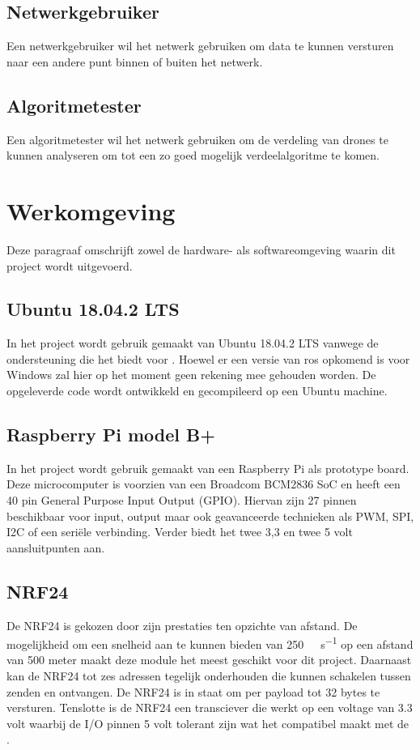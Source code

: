 \documentclass[a4paper, 11pt, oneside]{report}
\begin{document}
\subsection{Netwerkgebruiker}
\label{inleiding:gebruikers:netwerkgebruiker}
Een netwerkgebruiker wil het netwerk gebruiken om data te kunnen versturen naar een andere punt binnen of buiten het netwerk. 

\subsection{Algoritmetester}
\label{inleiding:gebruikers:algoritmetester}
Een algoritmetester wil het netwerk gebruiken om de verdeling van drones te kunnen analyseren om tot een zo goed mogelijk verdeelalgoritme te komen.

\section{Werkomgeving}
\label{inleiding:werkomgeving}
Deze paragraaf omschrijft zowel de hardware- als softwareomgeving waarin dit project wordt uitgevoerd. 

\subsection{Ubuntu 18.04.2 LTS}
\label{inleiding:werkomgeving:ubuntu}
In het project wordt gebruik gemaakt van Ubuntu 18.04.2 LTS vanwege de ondersteuning die het biedt voor .
Hoewel er een versie van ros opkomend is voor Windows zal hier op het moment geen rekening mee gehouden worden.
De opgeleverde code wordt ontwikkeld en gecompileerd op een Ubuntu machine.


\subsection{Raspberry Pi model B+}
\label{inleiding:werkomgeving:raspberrypi}

In het project wordt gebruik gemaakt van een Raspberry Pi als prototype board.
Deze microcomputer is voorzien van een Broadcom BCM2836 SoC en heeft een 40 pin General Purpose Input Output (GPIO).
Hiervan zijn 27 pinnen beschikbaar voor input, output maar ook geavanceerde technieken als PWM, SPI, I2C  of een seriële verbinding.
Verder biedt het twee 3,3 en twee 5 volt aansluitpunten aan.


\subsection{NRF24}
\label{inleiding:werkomgeving:nrf24}
De NRF24 is gekozen door zijn prestaties ten opzichte van afstand.
De mogelijkheid om een snelheid aan te kunnen bieden van \SI{250}{\kilo\bit\per\second} op een afstand van 500 meter maakt deze module het meest geschikt voor dit project.
Daarnaast kan de NRF24 tot zes adressen tegelijk onderhouden die kunnen schakelen tussen zenden en ontvangen.
De NRF24 is in staat om per payload tot 32 bytes te versturen. 
Tenslotte is de NRF24 een transciever die werkt op een voltage van 3.3 volt waarbij de I/O pinnen 5 volt tolerant zijn wat het compatibel maakt met de .
\end{document}
